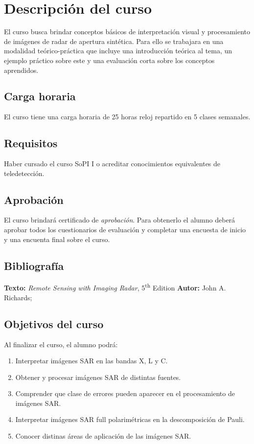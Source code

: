 
\chapter{Descripción del curso}

El curso busca brindar conceptos básicos de interpretación visual y procesamiento de imágenes de radar de apertura sintética. Para ello se trabajara en una modalidad teórico-práctica que incluye una introducción teórica al tema, un ejemplo práctico sobre este y una evaluación corta sobre los conceptos aprendidos.

\section*{Carga horaria}
El curso tiene una carga horaria de 25 horas reloj repartido en 5 clases semanales.

\section*{Requisitos} Haber cursado el curso SoPI I o acreditar conocimientos
equivalentes de teledetección.

\section*{Aprobación} El curso brindará certificado de \emph{aprobación}. Para obtenerlo el alumno deberá aprobar todos los cuestionarios de evaluación y completar una encuesta de inicio y una encuenta final sobre el curso.

\section*{Bibliografía}
\textbf {\large Texto:} \emph{Remote Sensing with Imaging Radar},
5\textsuperscript{th} Edition
\textbf {Autor:} John A. Richards; \\

\section*{Objetivos del curso}
Al finalizar el curso, el alumno podrá:
\begin{enumerate} \itemsep-0.4em
  \item Interpretar imágenes SAR en las bandas X, L y C.
  \item Obtener y procesar imágenes SAR de distintas fuentes.
  \item Comprender que clase de errores pueden aparecer en el procesamiento de imágenes SAR.
  \item Interpretar imágenes SAR full polarimétricas en la descomposición de Pauli.
  \item Conocer distinas áreas de aplicación de las imágenes SAR.
\end{enumerate}

